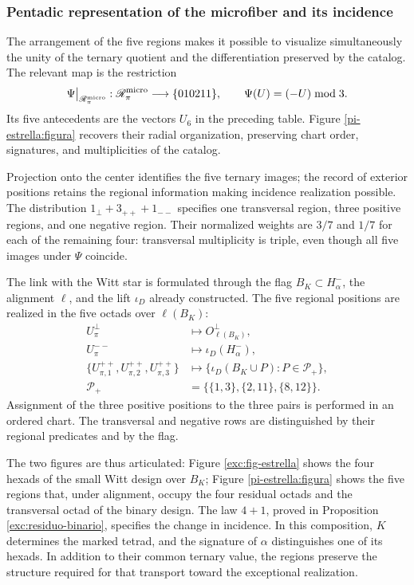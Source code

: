 \subsubsection{Pentadic representation of the microfiber and its incidence}
\label{pi-estrella:desarrollo}

The arrangement of the five regions makes it possible to visualize simultaneously
the unity of the ternary quotient and the differentiation preserved by the
catalog. The relevant map is the restriction
\[
 \Psi\big|_{\mathscr R_\pi^{\rm micro}}:
 \mathscr R_\pi^{\rm micro}\longrightarrow\{010211\},
 \qquad \Psi(U)=(-U)\bmod3.
\]
Its five antecedents are the vectors \(U_6\) in the preceding table.
Figure \ref{pi-estrella:figura} recovers their radial organization,
preserving chart order, signatures, and multiplicities of the
catalog.



Projection onto the center identifies the five ternary images; the
record of exterior positions retains the regional information
making incidence realization possible. The distribution
\(1_\perp+3_{++}+1_{--}\) specifies one transversal region, three
positive regions, and one negative region. Their normalized weights are
\(3/7\) and \(1/7\) for each of the remaining four: transversal
multiplicity is triple, even though all five images under
\(\Psi\) coincide.

The link with the Witt star is formulated through the flag
\(B_K\subset H^-_\alpha\), the alignment \(\ell\), and the
lift \(\iota_D\) already constructed. The five regional positions
are realized in the five octads over \(\ell(B_K)\):
\[
\begin{aligned}
 U_\pi^\perp&\longmapsto O^\perp_{\ell(B_K)},\\
 U_\pi^{--}&\longmapsto\iota_D(H^-_\alpha),\\
 \{U_{\pi,1}^{++},U_{\pi,2}^{++},U_{\pi,3}^{++}\}
 &\longmapsto
 \{\iota_D(B_K\cup P):P\in\mathcal P_+\},\\
 \mathcal P_+&=\bigl\{\{1,3\},\{2,11\},\{8,12\}\bigr\}.
\end{aligned}
\]
Assignment of the three positive positions to the three pairs is
performed in an ordered chart. The transversal and negative rows
are distinguished by their regional predicates and by the flag.

The two figures are thus articulated: Figure
\ref{exc:fig-estrella} shows the four hexads of the small Witt
design over \(B_K\); Figure \ref{pi-estrella:figura} shows
the five regions that, under alignment, occupy the four residual
octads and the transversal octad of the binary design. The law
\(4+1\), proved in Proposition
\ref{exc:residuo-binario}, specifies the change in incidence. In this
composition, \(K\) determines the marked tetrad, and the signature of
\(\alpha\) distinguishes one of its hexads. In addition to their common
ternary value, the regions preserve the structure required for that
transport toward the exceptional realization.

